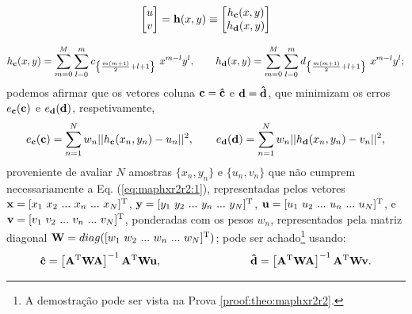 \begin{theorem}
\begin{minipage}{0.55\textwidth}
\begin{equation}
\begin{bmatrix}
u\\
v
\end{bmatrix} =
\VECTOR{h}(x,y) \equiv 
\begin{bmatrix}
h_{\VECTOR{c}}(x,y)\\
h_{\VECTOR{d}}(x,y)
\end{bmatrix}
\end{equation}
\end{minipage}
\begin{equation}\label{eq:maphxr2r2:1a}
h_{\VECTOR{c}}(x,y) = \sum \limits_{m=0}^{M} \sum \limits_{l=0}^{m}c_{\left\{ \frac{m(m+1)}{2}+l+1\right\}}~x^{m-l}y^{l}, 
\qquad
h_{\VECTOR{d}}(x,y) = \sum \limits_{m=0}^{M} \sum \limits_{l=0}^{m}d_{\left\{ \frac{m(m+1)}{2}+l+1\right\}}~x^{m-l}y^{l}; 
\end{equation}
podemos afirmar que os vetores coluna $\VECTOR{c}=\VECTOR{\hat{c}}$ e
$\VECTOR{d}=\VECTOR{\hat{d}}$,
que minimizam os erros $e_{\VECTOR{c}}(\VECTOR{c})$ e $e_{\VECTOR{d}}(\VECTOR{d})$,
respetivamente,
\begin{equation}\label{eq:maphxr2r2:2}
e_{\VECTOR{c}}(\VECTOR{c}) =  \sum_{n=1}^{N} w_n||h_{\VECTOR{c}}(x_n,y_n)-u_n||^2,\qquad 
e_{\VECTOR{d}}(\VECTOR{d}) =  \sum_{n=1}^{N} w_n||h_{\VECTOR{d}}(x_n,y_n)-v_n||^2,
\end{equation}
proveniente de avaliar $N$ amostras $\{x_n,y_n\}$ e $\{u_n,v_n\}$ 
que não cumprem necessariamente a Eq. (\ref{eq:maphxr2r2:1}), 
representadas pelos vetores 
$\VECTOR{x}=[x_1~ x_2~ ...~ x_n~ ...~ x_N]^{\transpose}$,
$\VECTOR{y}=[y_1~ y_2~ ...~ y_n~ ...~ y_N]^{\transpose}$, 
$\VECTOR{u}=[u_1~ u_2~ ...~ u_n~ ...~ u_N]^{\transpose}$, e
$\VECTOR{v}=[v_1~ v_2~ ...~ v_n~ ...~ v_N]^{\transpose}$,
ponderadas com os pesos $w_n$, 
representados pela matriz diagonal $\MATRIX{W}=\funcdiag([w_1~ w_2~ ...~ w_n~ ...~ w_N]^{\transpose})$;
pode ser achado\footnote{A demostração pode ser vista na Prova \ref{proof:theo:maphxr2r2}.} usando:
\begin{equation}\label{eq:maphxr2r2:3}
\VECTOR{\hat{c}}=
\left[ \MATRIX{A}^{\transpose} \MATRIX{W} \MATRIX{A} \right]^{-1}\MATRIX{A}^{\transpose} \MATRIX{W} \VECTOR{u},
\qquad \qquad \qquad \qquad
\VECTOR{\hat{d}}=
\left[ \MATRIX{A}^{\transpose} \MATRIX{W} \MATRIX{A} \right]^{-1}\MATRIX{A}^{\transpose} \MATRIX{W} \VECTOR{v}.

\end{equation}
\end{theorem}
